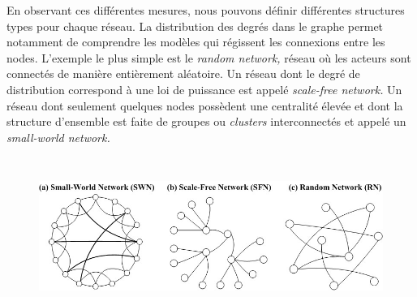 En observant ces diff\'erentes mesures, nous pouvons d\'efinir
diff\'erentes structures types pour chaque r\'eseau. La distribution
des degr\'es dans le graphe permet notamment de comprendre les
mod\`eles qui r\'egissent les connexions entre les nodes.
L{\textquoteright}exemple le plus simple est le \textit{random network,
}r\'eseau o\`u les acteurs sont connect\'es de mani\`ere enti\`erement
al\'eatoire. Un r\'eseau dont le degr\'e de distribution correspond \`a
une loi de puissance est appel\'e \textit{scale-free network. }Un
r\'eseau dont seulement quelques nodes poss\`edent une centralit\'e
\'elev\'ee et dont la structure d{\textquoteright}ensemble est faite de
groupes ou \textit{clusters} interconnect\'es et appel\'e un
\textit{small-world network. }


\begin{figure}
    \centering
    \includegraphics[width=6.3449in,height=2.0224in]{figures/chap3/chapitre3-img4.jpg}
\end{figure}

